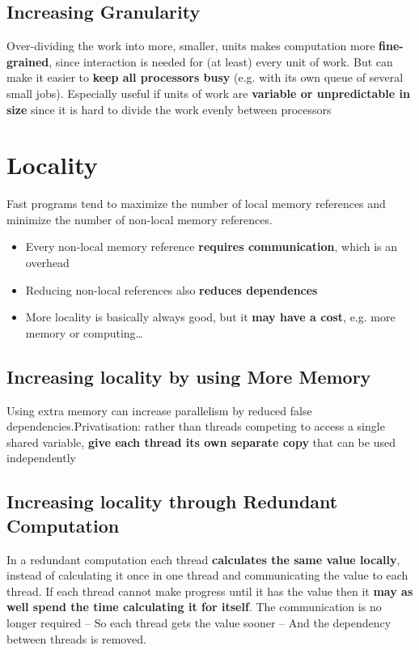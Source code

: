 \documentclass{article}
\begin{document}
\subsection{Increasing Granularity}
\begin{flushleft}
Over-dividing the work into more, smaller, units makes computation more \textbf{fine-grained}, since interaction is needed for (at least) every unit of work. But can make it easier to \textbf{keep all processors busy} (e.g. with its own queue of several small jobs). Especially useful if units of work are \textbf{variable or unpredictable in size} since it is hard to divide the work evenly between processors
\end{flushleft}

\section{Locality}
\begin{flushleft}
Fast programs tend to maximize the number of local memory references and minimize the number of non-local memory references.
\begin{itemize}
  \item Every non-local memory reference \textbf{requires communication}, which is an overhead 
  \item Reducing non-local references also \textbf{reduces dependences }
  \item More locality is basically always good, but it \textbf{may have a cost}, e.g. more memory or computing…
\end{itemize}
\end{flushleft}

\subsection{Increasing locality by using More Memory}
\begin{flushleft}
Using extra memory can increase parallelism by reduced false dependencies.Privatisation: rather than threads competing to access a single shared variable, \textbf{give each thread its own separate copy} that can be used independently
\end{flushleft}

\subsection{Increasing locality through Redundant Computation}
\begin{flushleft}
In a redundant computation each thread \textbf{calculates the same value locally}, instead of calculating it once in one thread and communicating the value to each thread. If each thread cannot make progress until it has the value then it \textbf{may as well spend the time calculating it for itself}. The communication is no longer required – So each thread gets the value sooner – And the dependency between threads is removed.
\end{flushleft}
\end{document}
